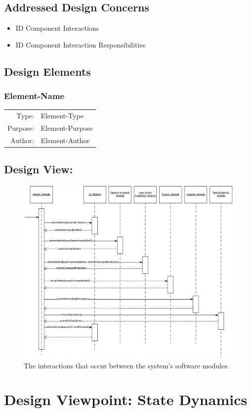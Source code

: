 \documentclass[onecolumn, draftclsnofoot,10pt, compsoc]{IEEEtran}
\newcommand{\designConcernRef}[2][]{
    #2 #1
}
\newcommand{\designElementDef}[4]{
    \subsubsection{#1}
    \begin{tabular}[t]{r p{6in}}
        Type: & #2 \\
        Purpose: & #3 \\
        Author: & #4 \\
    \end{tabular}
}
\begin{document}
    \subsection{Addressed Design Concerns}
        \begin{itemize}
            \item \designConcernRef[Component Interactions]{ID}
            \item \designConcernRef[Component Interaction Responsibilities]{ID}
        \end{itemize}

    \subsection{Design Elements}
        \designElementDef{Element-Name}{Element-Type}{Element-Purpose}{Element-Author}

    \subsection{Design View: }
		\begin{figure}[H]
			\includegraphics[width=1\textwidth, height=.35\textheight]{ModuleInteractionsUML.eps}
			\centering
			\caption{The interactions that occur between the system's software modules.}
			\label{fig::moduleInteractions}
		\end{figure}


\section{Design Viewpoint: State Dynamics}
\end{document}
